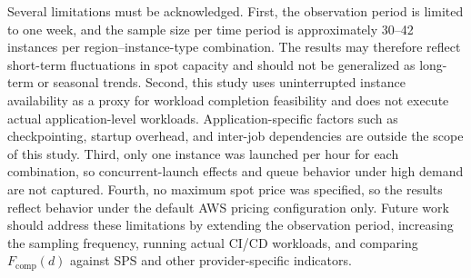 \documentclass[runningheads]{llncs}
\begin{document}
Several limitations must be acknowledged. First, the observation period is limited to one week, and the sample size per time period is approximately 30–42 instances per region--instance-type combination. The results may therefore reflect short-term fluctuations in spot capacity and should not be generalized as long-term or seasonal trends. Second, this study uses uninterrupted instance availability as a proxy for workload completion feasibility and does not execute actual application-level workloads. Application-specific factors such as checkpointing, startup overhead, and inter-job dependencies are outside the scope of this study. Third, only one instance was launched per hour for each combination, so concurrent-launch effects and queue behavior under high demand are not captured. Fourth, no maximum spot price was specified, so the results reflect behavior under the default AWS pricing configuration only. Future work should address these limitations by extending the observation period, increasing the sampling frequency, running actual CI/CD workloads, and comparing $F_{\mathrm{comp}}(d)$ against SPS and other provider-specific indicators.



\end{document}
